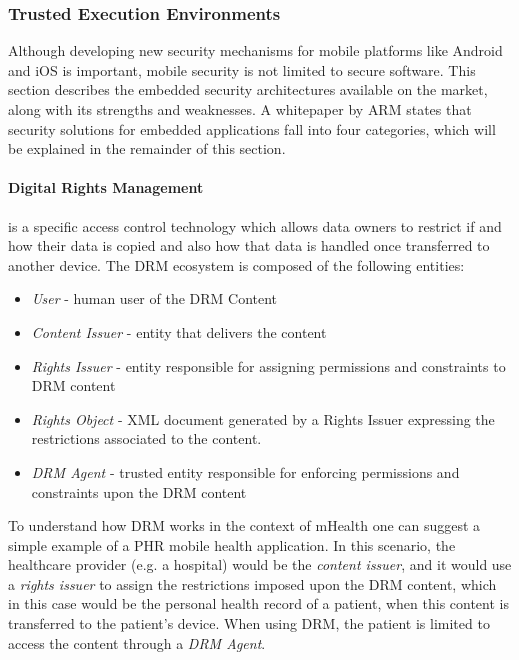 \subsubsection{Trusted Execution Environments} %

Although developing new security mechanisms for mobile platforms like Android and iOS is important, mobile security is not limited to secure software. This section describes the embedded security architectures available on the market, along with its strengths and weaknesses. A whitepaper \cite{trustzone_whitepaper} by \ac{ARM} states that security solutions for embedded applications fall into four categories, which will be explained in the remainder of this section.

\paragraph{\textbf{Digital Rights Management}} is a specific access control technology which allows data owners to restrict if and how their data is copied and also how that data is handled once transferred to another device. The \ac{DRM} ecosystem is composed of the following entities:

\begin{itemize}
	\item \emph{User} - human user of the DRM Content
	\item \emph{Content Issuer} - entity that delivers the content
	\item \emph{Rights Issuer} - entity responsible for assigning permissions and constraints to \ac{DRM} content
	\item \emph{Rights Object} - XML document generated by a Rights Issuer expressing the restrictions associated to the content.
	\item \emph{\ac{DRM} Agent} - trusted entity responsible for enforcing permissions and constraints upon the \ac{DRM} content
\end{itemize}

To understand how \ac{DRM} works in the context of mHealth one can suggest a simple example of a \ac{PHR} mobile health application. In this scenario, the healthcare provider (e.g. a hospital) would be the \emph{content issuer}, and it would use a \emph{rights issuer} to assign the restrictions imposed upon the \ac{DRM} content, which in this case would be the personal health record of a patient, when this content is transferred to the patient's device. When using \ac{DRM}, the patient is limited to access the content through a \emph{\ac{DRM} Agent}.

